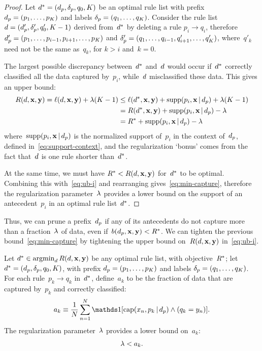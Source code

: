 \begin{proof}
Let ${d^* = (d_p, \delta_p, q_0, K)}$ be an optimal
rule list with prefix ${d_p = (p_1, \dots, p_K)}$
and labels ${\delta_p = (q_1, \dots, q_K)}$.
%
Consider the rule list ${{d} =  (d_p', \delta_p', q_0', K-1)}$
derived from~$d^*$ by deleting a rule ${p_i \rightarrow q_i}$,
therefore ${d_p' = (p_1, \dots, p_{i-1}, p_{i+1}, \dots, p_K)}$
and ${\delta_p' = (q_1, \dots, q_{i-1}, q'_{i+1}, \dots, q'_K)}$,
where~$q'_k$ need not be the same as~$q_k$, for ${k > i}$ and~${k = 0}$.

The largest possible discrepancy between~$d^*$ and~${d}$ would occur
if~$d^*$ correctly classified all the data captured by~$p_i$,
while~${d}$ misclassified these data.
%
This gives an upper bound:
\begin{align}
\Obj(\RL, \x, \y) = \Loss(\RL, \x, \y) + \Reg (K - 1)
&\le \Loss(\OptimalRL, \x, \y) + \Supp(p_i, \x \given \Prefix) + \Reg(K - 1) \nn \\
&= \Obj(\OptimalRL, \x, \y) + \Supp(p_i, \x \given \Prefix) - \Reg \nn \\
&= \OptimalObj + \Supp(p_i, \x \given \Prefix) - \Reg
\label{eq:ub-i}
\end{align}
where~$\textnormal{supp}(p_i, \mathbf{x} \,|\, d_p)$ is the normalized support of~$p_i$
in the context of~$d_p$, defined in~\eqref{eq:support-context},
and the regularization `bonus' comes from the fact that~${d}$
is one rule shorter than~$d^*$.

At the same time, we must have ${R^* < R({d}, \mathbf{x}, \mathbf{y})}$ for~$d^*$ to be optimal.
%
Combining this with~\eqref{eq:ub-i} and rearranging gives~\eqref{eq:min-capture},
therefore the regularization parameter~${\lambda}$ provides a lower bound
on the support of an antecedent~$p_i$ in an optimal rule list~$d^*$.
\end{proof}

Thus, we can prune a prefix~$d_p$ if any of its antecedents do not capture
more than a fraction~${\lambda}$ of data, even if~${b(d_p, \mathbf{x}, \mathbf{y}) < R^*}$.
%
We can tighten the previous bound~\eqref{eq:min-capture}
by tightening the upper bound on~$R({d}, \mathbf{x}, \mathbf{y})$ in~\eqref{eq:ub-i}.

\begin{theorem}
\label{thm:min-capture-correct}
Let ${d^* \in \operatorname*{argmin}_{d} R({d}, \mathbf{x}, \mathbf{y})}$
be any optimal rule list, with objective~$R^*$;
let ${d^* = (d_p, \delta_p, q_0, K)}$,
with prefix ${d_p = (p_1, \dots, p_K)}$
and labels ${\delta_p = (q_1, \dots, q_K)}$.
%
For each rule~${p_k \rightarrow q_k}$ in~$d^*$,
define~$a_k$ to be the fraction of data that are captured by~$p_k$
and correctly classified:
\begin{align}
a_k \equiv \frac{1}{N} \sum_{n=1}^N
  \one [ \Cap(x_n, p_k \given \Prefix) \wedge (q_k = y_n) ].
\label{eq:rule-correct}
\end{align}
The regularization parameter~${\lambda}$ provides a lower bound on~$a_k$:
\begin{align}
\Reg < a_k.
\label{eq:min-capture-correct}
\end{align}
\end{theorem}

